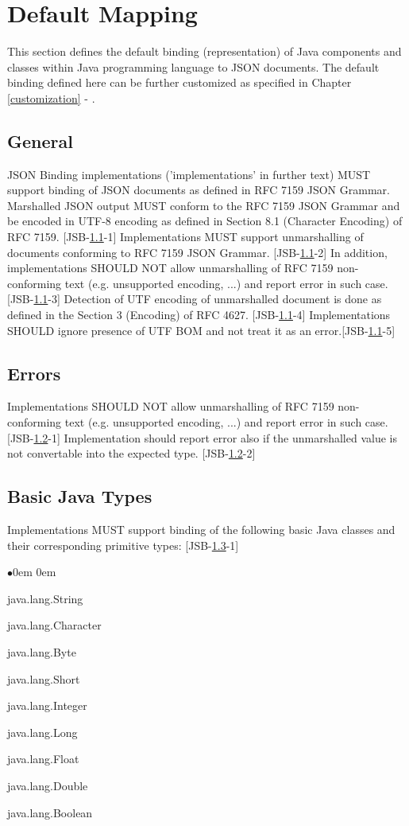 \chapter{Default Mapping}
\label{defaultmapping}

This section defines the default binding (representation) of Java components and classes within Java programming language to JSON documents. The default binding defined here can be further customized as specified in Chapter \ref{customization} - .

\section{General}
\label{sec:general}
JSON Binding implementations ('implementations' in further text) MUST support binding of JSON documents as defined in RFC 7159 JSON Grammar. Marshalled JSON output MUST conform to the RFC 7159 JSON Grammar and be encoded in UTF-8 encoding as defined in Section 8.1 (Character Encoding) of RFC 7159. [JSB-\ref{sec:general}-1] 
Implementations MUST support unmarshalling of documents conforming to RFC 7159 JSON Grammar. [JSB-\ref{sec:general}-2] In addition, implementations SHOULD NOT allow unmarshalling of RFC 7159 non-conforming text (e.g. unsupported encoding, ...) and report error in such case. [JSB-\ref{sec:general}-3] Detection of UTF encoding of unmarshalled document is done as defined in the Section 3 (Encoding) of RFC 4627. [JSB-\ref{sec:general}-4] Implementations SHOULD ignore presence of UTF BOM and not treat it as an error.[JSB-\ref{sec:general}-5]

\section{Errors}
\label{sec:errors}
Implementations SHOULD NOT allow unmarshalling of RFC 7159 non-conforming text (e.g. unsupported encoding, ...) and report error in such case. [JSB-\ref{sec:errors}-1] Implementation should report error also if the unmarshalled value is not convertable into the expected type. [JSB-\ref{sec:errors}-2]

\section{Basic Java Types}
\label{sec:basic}
Implementations MUST support binding of the following basic Java classes and their corresponding primitive types: [JSB-\ref{sec:basic}-1]
\begin{list}{$\bullet$}{\parsep 0em  0em}
\item java.lang.String
\item java.lang.Character
\item java.lang.Byte
\item java.lang.Short
\item java.lang.Integer
\item java.lang.Long
\item java.lang.Float
\item java.lang.Double
\item java.lang.Boolean
\end{list}

